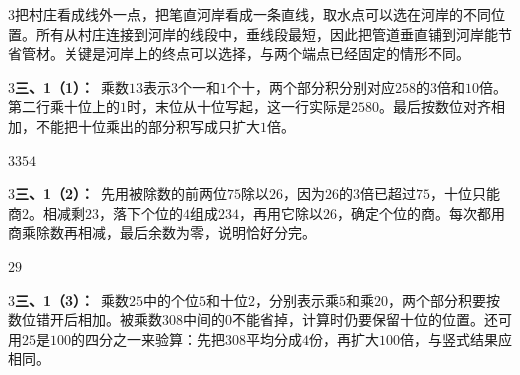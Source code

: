 \documentclass[multi=snippet,border={5bp 20bp 5bp 5bp}]{standalone}
\newenvironment{snippet}[3]{\begin{minipage}{#1bp}\color{answerred}\fontsize{#2}{#3}\selectfont\raggedright}{\end{minipage}}
\begin{document}
\begin{snippet}{505}{11.5}{14}\begin{multicols}{3}\raggedcolumns 把村庄看成线外一点，把笔直河岸看成一条直线，取水点可以选在河岸的不同位置。所有从村庄连接到河岸的线段中，垂线段最短，因此把管道垂直铺到河岸能节省管材。关键是河岸上的终点可以选择，与两个端点已经固定的情形不同。\end{multicols}\end{snippet}
\begin{snippet}{505}{11.5}{14}\begin{multicols}{3}\raggedcolumns \textbf{三、1（1）：}\ 乘数\(13\)\allowbreak 表示\(3\)\allowbreak 个一和\(1\)\allowbreak 个十，两个部分积分别对应\(258\)\allowbreak 的\(3\)\allowbreak 倍和\(10\)\allowbreak 倍。第二行乘十位上的\(1\)\allowbreak 时，末位从十位写起，这一行实际是\(2580\)\allowbreak 。最后按数位对齐相加，不能把十位乘出的部分积写成只扩大\(1\)\allowbreak 倍。\end{multicols}\end{snippet}
\begin{snippet}{27.0}{10.5}{14}\SourceSans\setlength{\mathindent}{2bp}\(3354\)\end{snippet}
\begin{snippet}{505}{11.5}{14}\begin{multicols}{3}\raggedcolumns \textbf{三、1（2）：}\ 先用被除数的前两位\(75\)\allowbreak 除以\(26\)\allowbreak ，因为\(26\)\allowbreak 的\(3\)\allowbreak 倍已超过\(75\)\allowbreak ，十位只能商\(2\)\allowbreak 。相减剩\(23\)\allowbreak ，落下个位的\(4\)\allowbreak 组成\(234\)\allowbreak ，再用它除以\(26\)\allowbreak ，确定个位的商。每次都用商乘除数再相减，最后余数为零，说明恰好分完。\end{multicols}\end{snippet}
\begin{snippet}{19.0}{10.5}{14}\SourceSans\setlength{\mathindent}{2bp}\(29\)\end{snippet}
\begin{snippet}{505}{11.5}{14}\begin{multicols}{3}\raggedcolumns \textbf{三、1（3）：}\ 乘数\(25\)\allowbreak 中的个位\(5\)\allowbreak 和十位\(2\)\allowbreak ，分别表示乘\(5\)\allowbreak 和乘\(20\)\allowbreak ，两个部分积要按数位错开后相加。被乘数\(308\)\allowbreak 中间的\(0\)\allowbreak 不能省掉，计算时仍要保留十位的位置。还可用\(25\)\allowbreak 是\(100\)\allowbreak 的四分之一来验算：先把\(308\)\allowbreak 平均分成\(4\)\allowbreak 份，再扩大\(100\)\allowbreak 倍，与竖式结果应相同。\end{multicols}\end{snippet}
\end{document}
